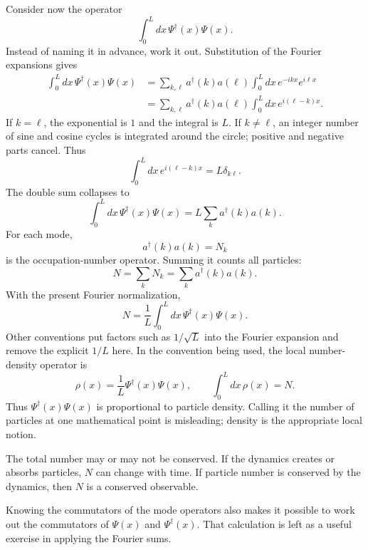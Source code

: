 Consider now the operator
\begin{equation}
\int_0^L dx\,\Psi^\dagger(x)\Psi(x).
\end{equation}
Instead of naming it in advance, work it out. Substitution of the Fourier expansions gives
\begin{align}
\int_0^L dx\,\Psi^\dagger(x)\Psi(x)
&=
\sum_{k,\ell}a^\dagger(k)a(\ell)
\int_0^L dx\,e^{-ikx}e^{i\ell x}
\\
&=
\sum_{k,\ell}a^\dagger(k)a(\ell)
\int_0^L dx\,e^{i(\ell-k)x}.
\end{align}
If \(k=\ell\), the exponential is \(1\) and the integral is \(L\). If \(k\ne\ell\), an integer number of sine and cosine cycles is integrated around the circle; positive and negative parts cancel. Thus
\begin{equation}
\int_0^L dx\,e^{i(\ell-k)x}=L\delta_{k\ell}.
\end{equation}
The double sum collapses to
\begin{equation}
\int_0^L dx\,\Psi^\dagger(x)\Psi(x)
=L\sum_k a^\dagger(k)a(k).
\end{equation}
For each mode,
\begin{equation}
a^\dagger(k)a(k)=N_k
\end{equation}
is the occupation-number operator. Summing it counts all particles:
\begin{equation}
N=\sum_k N_k=\sum_k a^\dagger(k)a(k).
\end{equation}
With the present Fourier normalization,
\begin{equation}
N=\frac{1}{L}\int_0^L dx\,
\Psi^\dagger(x)\Psi(x).
\end{equation}
Other conventions put factors such as \(1/\sqrt{L}\) into the Fourier expansion and remove the explicit \(1/L\) here. In the convention being used, the local number-density operator is
\begin{equation}
\rho(x)=\frac{1}{L}\Psi^\dagger(x)\Psi(x),
\qquad
\int_0^L dx\,\rho(x)=N.
\end{equation}
Thus \(\Psi^\dagger(x)\Psi(x)\) is proportional to particle density. Calling it the number of particles at one mathematical point is misleading; density is the appropriate local notion.

The total number may or may not be conserved. If the dynamics creates or absorbs particles, \(N\) can change with time. If particle number is conserved by the dynamics, then \(N\) is a conserved observable.

Knowing the commutators of the mode operators also makes it possible to work out the commutators of \(\Psi(x)\) and \(\Psi^\dagger(x)\). That calculation is left as a useful exercise in applying the Fourier sums.

